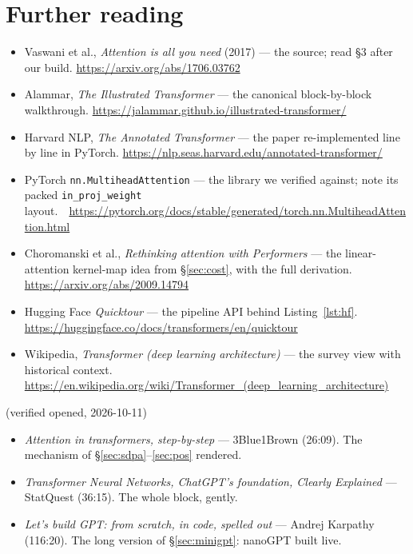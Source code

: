 \section*{Further reading}
\label{sec:further11}
\begin{itemize}
\item Vaswani et al., \emph{Attention is all you need} (2017) ---
the source; read \S3 after our build.
\url{https://arxiv.org/abs/1706.03762}
\item Alammar, \emph{The Illustrated Transformer} --- the canonical
block-by-block walkthrough.
\url{https://jalammar.github.io/illustrated-transformer/}
\item Harvard NLP, \emph{The Annotated Transformer} --- the paper
re-implemented line by line in PyTorch.
\url{https://nlp.seas.harvard.edu/annotated-transformer/}
\item PyTorch \texttt{nn.MultiheadAttention} --- the library we
verified against; note its packed \texttt{in\_proj\_weight} layout.~\
\url{https://pytorch.org/docs/stable/generated/torch.nn.MultiheadAttention.html}
\item Choromanski et al., \emph{Rethinking attention with
Performers} --- the linear-attention kernel-map idea from
\S\ref{sec:cost}, with the full derivation.
\url{https://arxiv.org/abs/2009.14794}
\item Hugging Face \emph{Quicktour} --- the pipeline API behind
Listing~\ref{lst:hf}.
\url{https://huggingface.co/docs/transformers/en/quicktour}
\item Wikipedia, \emph{Transformer (deep learning architecture)} ---
the survey view with historical context.
\url{https://en.wikipedia.org/wiki/Transformer_(deep_learning_architecture)}
\end{itemize}

\begin{rulebox}
(verified opened, 2026-10-11)
\begin{itemize}
\item \emph{Attention in transformers, step-by-step} --- 3Blue1Brown
(26:09). The mechanism of \S\ref{sec:sdpa}--\ref{sec:pos} rendered.
\item \emph{Transformer Neural Networks, ChatGPT's foundation,
Clearly Explained} --- StatQuest (36:15). The whole block, gently.
\item \emph{Let's build GPT: from scratch, in code, spelled out} ---
Andrej Karpathy (116:20). The long version of \S\ref{sec:minigpt}:
nanoGPT built live.
\end{itemize}
\end{rulebox}

